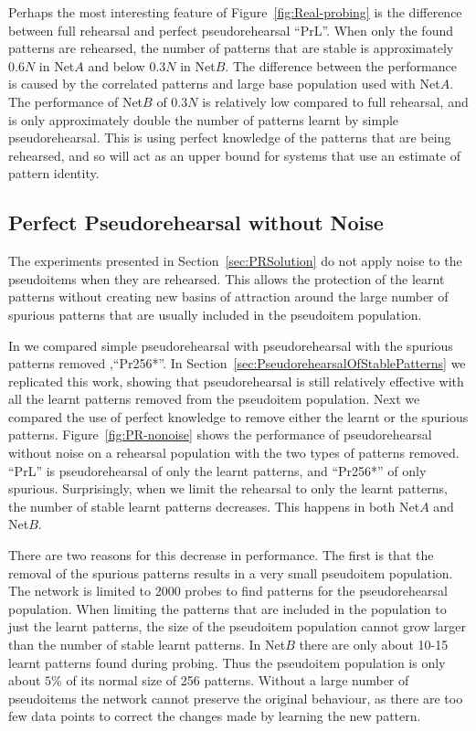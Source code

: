 Perhaps the most interesting feature of Figure~\ref{fig:Real-probing} is the difference between full rehearsal and perfect pseudorehearsal ``PrL\noiseConst{}''.  When only the found patterns are rehearsed, the number of patterns that are stable is approximately $0.6N$ in Net$A$ and below $0.3N$ in Net$B$.  The difference between the performance is caused by the correlated patterns and large base population used with Net$A$.  The performance of Net$B$ of $0.3N$ is relatively low compared to full rehearsal, and is only approximately double the number of patterns learnt by simple pseudorehearsal.  This is using perfect knowledge of the patterns that are being rehearsed, and so will act as an upper bound for systems that use an estimate of pattern identity.

\subsection{Perfect Pseudorehearsal without Noise}

The experiments presented in Section~\ref{sec:PRSolution} do not apply noise to the pseudoitems when they are rehearsed.  This allows the protection of the learnt patterns without creating new basins of attraction around the large number of spurious patterns that are usually included in the pseudoitem population.  

In \citet{Robins1998} we compared simple pseudorehearsal with pseudorehearsal with the spurious patterns removed ,``Pr256*''.  In Section~\ref{sec:PseudorehearsalOfStablePatterns} we replicated this work, showing that pseudorehearsal is still relatively effective with all the learnt patterns removed from the pseudoitem population.    Next we compared the use of perfect knowledge to remove either the learnt or the spurious patterns.  Figure~\ref{fig:PR-nonoise} shows the performance of pseudorehearsal without noise on a rehearsal population with the two types of patterns removed.  ``PrL'' is pseudorehearsal of only the learnt patterns, and ``Pr256*'' of only spurious.  Surprisingly, when we limit the rehearsal to only the learnt patterns, the number of stable learnt patterns decreases.  This happens in both Net$A$ and Net$B$.

There are two reasons for this decrease in performance.  The first is that the removal of the spurious patterns results in a very small pseudoitem population.  The network is limited to 2000 probes to find patterns for the pseudorehearsal population.  When limiting the patterns that are included in the population to just the learnt patterns, the size of the pseudoitem population cannot grow larger than the number of stable learnt patterns.  In Net$B$ there are only about 10-15 learnt patterns found during probing.  Thus the pseudoitem population is only about $5\%$ of its normal size of 256 patterns.  Without a large number of pseudoitems the network cannot preserve the original behaviour, as there are too few data points to correct the changes made by learning the new pattern.

